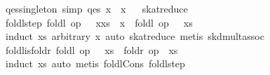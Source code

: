 \begin{isabellebody}
\endisatagproof
{\isafoldproof}%
%
\isadelimproof
%
\endisadelimproof
\isanewline
{}\isamarkupfalse%
\ qes{}singleton\ {}simp{}{}\ {}qes\ {}x{}\ {}\ x{}%
\isadelimproof
\ %
\endisadelimproof
%
\isatagproof
{}\isamarkupfalse%
\ skat{}reduce%
\endisatagproof
{\isafoldproof}%
%
\isadelimproof
%
\endisadelimproof
\isanewline
\isanewline
{}\isamarkupfalse%
\ foldl{}step{}\ {}foldl\ op\ {}\ {}\ {}x{}xs{}\ {}\ x\ {}\ foldl\ op\ {}\ {}\ xs{}\isanewline
%
\isadelimproof
\ \ %
\endisadelimproof
%
\isatagproof
{}\isamarkupfalse%
\ {}induct\ xs\ arbitrary{}\ x{}\ auto{}\ skat{}reduce{}\ metis\ skd{}mult{}assoc{}%
\endisatagproof
{\isafoldproof}%
%
\isadelimproof
\isanewline
%
\endisadelimproof
\isanewline
{}\isamarkupfalse%
\ foldl{}is{}foldr{}\ {}foldl\ op\ {}\ {}\ xs\ {}\ foldr\ op\ {}\ xs\ {}{}\isanewline
%
\isadelimproof
\ \ %
\endisadelimproof
%
\isatagproof
{}\isamarkupfalse%
\ {}induct\ xs{}\ auto{}\ metis\ foldl{}Cons\ foldl{}step{}%

\end{isabellebody}
